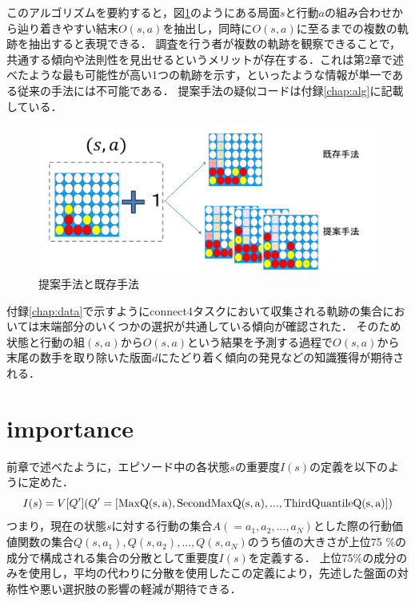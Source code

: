 このアルゴリズムを要約すると，図\ref{fig:merit}のようにある局面$s$と行動$a$の組み合わせから辿り着きやすい結末$O(s, a)$を抽出し，同時に$O(s, a)$に至るまでの複数の軌跡を抽出すると表現できる．
調査を行う者が複数の軌跡を観察できることで，
共通する傾向や法則性を見出せるというメリットが存在する．これは第2章で述べたような最も可能性が高い1つの軌跡を示す，といったような情報が単一である従来の手法には不可能である．
提案手法の疑似コードは付録\ref{chap:alg}に記載している．

\begin{figure}[htbp]
    \includegraphics[width=400pt]{./figure/merit.png}
	\caption{提案手法と既存手法}
	\label{fig:merit}
\end{figure}




付録\ref{chap:data}で示すようにconnect4タスクにおいて収集される軌跡の集合においては末端部分のいくつかの選択が共通している傾向が確認された．
そのため状態と行動の組$(s, a)$から$O(s, a)$という結果を予測する過程で$O(s, a)$から末尾の数手を取り除いた版面$d$にたどり着く傾向の発見などの知識獲得が期待される．
\section{importance}
前章で述べたように，エピソード中の各状態$s$の重要度$I(s)$の定義を以下のように定めた．
\begin{equation}
    \label{new-imp}
	{I(s)=V[Q'] (Q'=[\rm{Max}Q(s, a), \rm{SecondMax}Q(s, a), ..., \rm{ThirdQuantile}Q(s, a)])}
\end{equation}
つまり，現在の状態$s$に対する行動の集合$A(={a_1, a_2, ..., a_N})$とした際の行動価値関数の集合${Q(s, a_1), Q(s, a_2), ..., Q(s, a_N)}$のうち値の大きさが上位75
\%の成分で構成される集合の分散として重要度$I(s)$を定義する．
上位75\%の成分のみを使用し，平均の代わりに分散を使用したこの定義により，先述した盤面の対称性や悪い選択肢の影響の軽減が期待できる．

